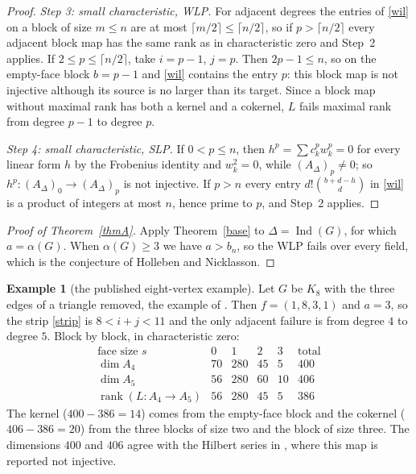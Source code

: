 \documentclass[11pt,a4paper]{article}
\theoremstyle{definition}
\newtheorem{example}[theorem]{Example}
\newcommand{\rk}{\operatorname{rank}}
\begin{document}
\begin{proof}
\emph{Step 3: small characteristic, WLP.} For adjacent degrees the entries of \eqref{wil} on a block of size $m\le n$ are at most $\lceil m/2\rceil\le\lceil n/2\rceil$, so if $p>\lceil n/2\rceil$ every adjacent block map has the same rank as in characteristic zero and Step~2 applies. If $2\le p\le\lceil n/2\rceil$, take $i=p-1$, $j=p$. Then $2p-1\le n$, so on the empty-face block $b=p-1$ and \eqref{wil} contains the entry $p$: this block map is not injective although its source is no larger than its target. Since a block map without maximal rank has both a kernel and a cokernel, $L$ fails maximal rank from degree $p-1$ to degree $p$.

\emph{Step 4: small characteristic, SLP.} If $0<p\le n$, then $h^p=\sum c_k^pw_k^p=0$ for every linear form $h$ by the Frobenius identity and $w_k^2=0$, while $(A_\Delta)_p\ne0$; so $h^p:(A_\Delta)_0\to(A_\Delta)_p$ is not injective. If $p>n$ every entry $d!\binom{b+d-h}d$ in \eqref{wil} is a product of integers at most $n$, hence prime to $p$, and Step~2 applies.
\end{proof}

\begin{proof}[Proof of Theorem~\ref{thmA}]
Apply Theorem~\ref{base} to $\Delta=\operatorname{Ind}(G)$, for which $a=\alpha(G)$. When $\alpha(G)\ge3$ we have $a>b_n$, so the WLP fails over every field, which is the conjecture of Holleben and Nicklasson.
\end{proof}

\begin{example}[the published eight-vertex example]\label{ex8}
Let $G$ be $K_8$ with the three edges of a triangle removed, the example of \cite[Example~3.17]{HN}. Then $f=(1,8,3,1)$ and $a=3$, so the strip \eqref{strip} is $8<i+j<11$ and the only adjacent failure is from degree $4$ to degree $5$. Block by block, in characteristic zero:
\[
\begin{array}{c|rrrr|r}
\text{face size }s&0&1&2&3&\text{total}\\ \hline
\dim A_4&70&280&45&5&400\\
\dim A_5&56&280&60&10&406\\
\rk(L:A_4\to A_5)&56&280&45&5&386
\end{array}
\]
The kernel ($400-386=14$) comes from the empty-face block and the cokernel ($406-386=20$) from the three blocks of size two and the block of size three. The dimensions $400$ and $406$ agree with the Hilbert series in \cite{HN}, where this map is reported not injective.
\end{example}
\end{document}
